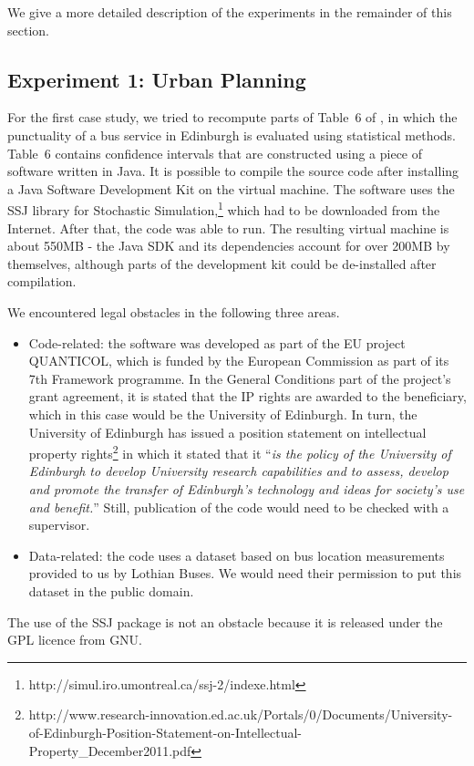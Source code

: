 We give a more detailed description of the experiments in the remainder of this section.

\subsection*{Experiment 1: Urban Planning}

For the first case study, we tried to recompute parts of Table~6 of \cite{danielpaper}, in which the punctuality of a bus service in Edinburgh is evaluated using statistical methods. Table~6 contains confidence intervals that are constructed using a piece of software written in Java. It is possible to compile the source code after installing a Java Software Development Kit on the virtual machine. The software uses the SSJ library for Stochastic Simulation,\footnote{http://simul.iro.umontreal.ca/ssj-2/indexe.html} which had to be downloaded from the Internet. After that, the code was able to run.
The resulting virtual machine is about 550MB - the Java SDK and its dependencies account for over 200MB by themselves, although parts of the development kit could be de-installed after compilation.

We encountered legal obstacles in the following three areas.
\begin{itemize} 
\item Code-related: the software was developed as part of the EU project QUANTICOL, which is funded by the European Commission as part of its 7th Framework programme. In the General Conditions part of the project's grant agreement, it is stated that the IP rights are awarded to the beneficiary, which in this case would be the University of Edinburgh. In turn, the University of Edinburgh has issued a position statement on intellectual property rights\footnote{http://www.research-innovation.ed.ac.uk/Portals/0/Documents/University-of-Edinburgh-Position-Statement-on-Intellectual-Property\_December2011.pdf} in which it stated that it ``\emph{is the policy of the University of Edinburgh to develop University research capabilities and to assess, develop and promote the transfer of Edinburgh's technology and ideas for society's use and benefit.}'' Still, publication of the code would need to be checked with a supervisor.
\item Data-related: the code uses a dataset based on bus location measurements provided to us by Lothian Buses. We would need their permission to put this dataset in the public domain.
\end{itemize}
The use of the SSJ package is not an obstacle because it is released under the GPL licence from GNU.

